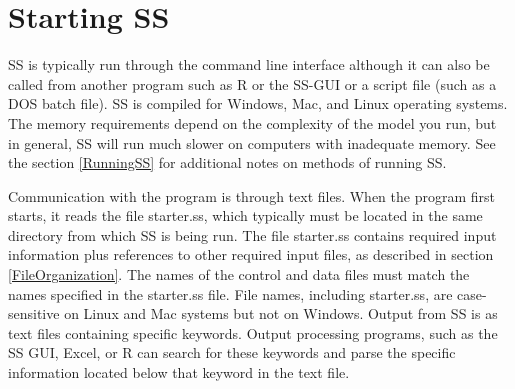 \section{Starting SS}
SS is typically run through the command line interface although it can also be called from another program such as R or the SS-GUI or a script file (such as a DOS batch file). SS is compiled for Windows, Mac, and Linux operating systems. The memory requirements depend on the complexity of the model you run, but in general, SS will run much slower on computers with inadequate memory. See the section \ref{RunningSS} for additional notes on methods of running SS.

Communication with the program is through text files.  When the program first starts, it reads the file starter.ss, which typically must be located in the same directory from which SS is being run.  The file starter.ss contains required input information plus references to other required input files, as described in section \ref{FileOrganization}.  The names of the control and data files must match the names specified in the starter.ss file.  File names, including starter.ss, are case-sensitive on Linux and Mac systems but not on Windows. Output from SS is as text files containing specific keywords.  Output processing programs, such as the SS GUI, Excel, or R can search for these keywords and parse the specific information located below that keyword in the text file.

